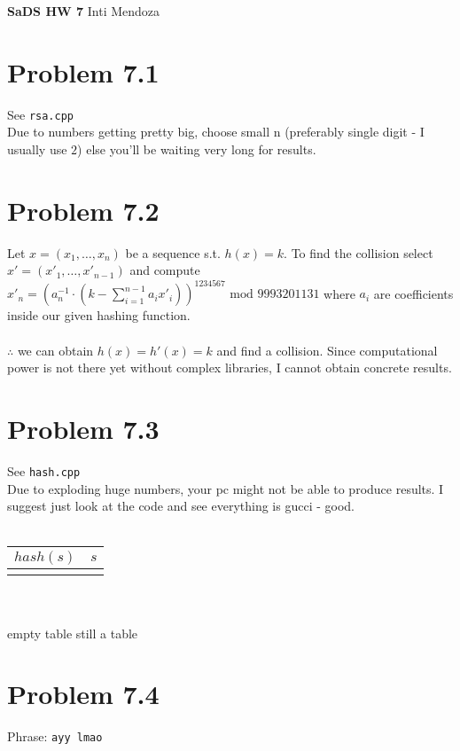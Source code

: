 \documentclass[11pt]{article}
\begin{document}
\huge \textbf{SaDS HW 7} 
\large \hfill Inti Mendoza \\

\section*{Problem 7.1}

See \texttt{rsa.cpp}\\
Due to numbers getting pretty big, choose small n (preferably single digit - I usually use $2$) else you'll be waiting very long for results.

\section*{Problem 7.2}

Let $x = (x_1, \dots, x_n)$ be a sequence s.t. $h(x) = k$. To find the collision select $x' = (x'_1, \dots, x'_{n-1})$ and compute
$x'_n = (a_n^{-1} \cdot (k - \displaystyle\sum^{n-1}_{i = 1} a_ix'_i))^{1234567}\text{ mod }9993201131$ where $a_i$ are coefficients inside our given hashing function.\\ \\
$\therefore$ we can obtain $h(x) = h'(x) = k$ and find a collision. Since computational power is not there yet without complex libraries, I cannot obtain concrete results.

\section*{Problem 7.3}

See \texttt{hash.cpp}\\
Due to exploding huge numbers, your pc might not be able to produce results. I suggest just look at the code and see everything is gucci - good.\\ \\
\begin{tabular}{l | l}
	$hash(s)$	&	$s$	\\ \hline
	\hspace{1 cm}	&	\hspace{1 cm}
\end{tabular} \\ \\
{\tiny empty table still a table}

\section*{Problem 7.4}

Phrase: \texttt{ayy lmao}
\end{document}
